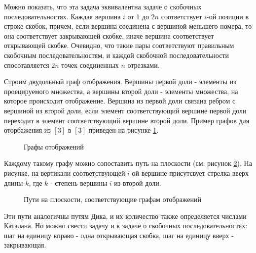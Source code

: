 \documentclass[a4paper,12pt]{article}
\begin{document}
\begin{Solution}
Можно показать, что эта задача эквивалентна задаче о скобочных последовательностях. Каждая вершина $i$ от 1 до $2n$ соответствует $i$-ой позиции в строке скобок, причем, если вершина соединена с вершиной меньшего номера, то она соответствует закрывающей скобке, иначе вершина соответствует открывающей скобке. Очевидно, что такие пары соответствуют правильным скобочным последовательностям, и каждой скобочной последовательности спосотавляется $2n$ точек соединенных $n$ отрезками.

Строим двудольный граф отображения. Вершины первой доли - элементы из проецируемого множества, а вершины второй доли - элементы множества, на которое происходит отображение. Вершина из первой доли связана ребром с вершиной из второй доли, если элемент соответствующий вершине первой доли переходит в элемент соответствующий вершине второй доли. Пример графов для оторбажения из $\left[3\right]$ в $\left[3\right]$ приведен на рисунке \ref{img::mapping}.

\begin{figure}[h]
\caption{Графы отображений}
\label{img::mapping}
\end{figure}

Каждому такому графу можно сопоставить путь на плоскости (см. рисунок \ref{img::paths}). На рисунке, на вертикали соответствующей $i$-ой вершине присутсвует стрелка вверх длины $k$, где $k$ - степень вершины $i$ из второй доли.

\begin{figure}[h]
\caption{Пути на плоскости, соответствующие графам отображений}
\label{img::paths}
\end{figure}

Эти пути аналогичны путям Дика, и их количество также определяется числами Каталана. Но можно свести задачу и к задаче о скобочных последовательностях: шаг на единицу вправо - одна открывающая скобка, шаг на единицу вверх - закрывающая.


\end{Solution}
\end{document}
